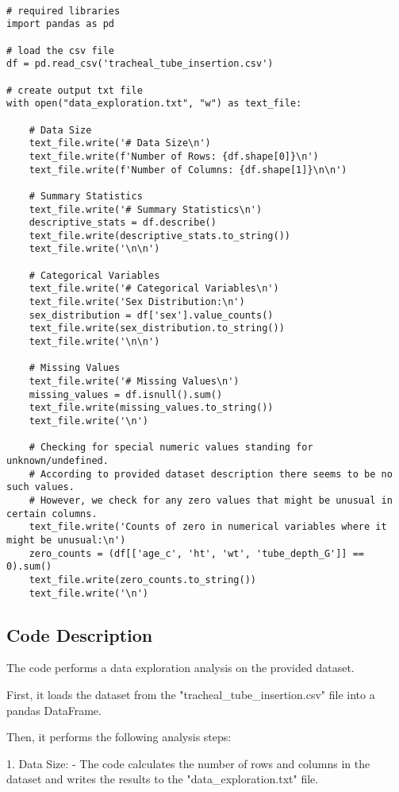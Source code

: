 \documentclass[11pt]{article}
\begin{document}
\begin{verbatim}

# required libraries
import pandas as pd

# load the csv file
df = pd.read_csv('tracheal_tube_insertion.csv')

# create output txt file
with open("data_exploration.txt", "w") as text_file:
    
    # Data Size
    text_file.write('# Data Size\n')
    text_file.write(f'Number of Rows: {df.shape[0]}\n')
    text_file.write(f'Number of Columns: {df.shape[1]}\n\n')

    # Summary Statistics
    text_file.write('# Summary Statistics\n')
    descriptive_stats = df.describe()
    text_file.write(descriptive_stats.to_string())
    text_file.write('\n\n')

    # Categorical Variables
    text_file.write('# Categorical Variables\n')
    text_file.write('Sex Distribution:\n')
    sex_distribution = df['sex'].value_counts()
    text_file.write(sex_distribution.to_string())
    text_file.write('\n\n')

    # Missing Values
    text_file.write('# Missing Values\n')
    missing_values = df.isnull().sum()
    text_file.write(missing_values.to_string())
    text_file.write('\n')

    # Checking for special numeric values standing for unknown/undefined.
    # According to provided dataset description there seems to be no such values. 
    # However, we check for any zero values that might be unusual in certain columns.
    text_file.write('Counts of zero in numerical variables where it might be unusual:\n')
    zero_counts = (df[['age_c', 'ht', 'wt', 'tube_depth_G']] == 0).sum()
    text_file.write(zero_counts.to_string())
    text_file.write('\n') 

\end{verbatim}

\subsection{Code Description}

The code performs a data exploration analysis on the provided dataset. 

First, it loads the dataset from the "tracheal\_tube\_insertion.csv" file into a pandas DataFrame. 

Then, it performs the following analysis steps:

1. Data Size:
   - The code calculates the number of rows and columns in the dataset and writes the results to the "data\_exploration.txt" file.
\end{document}
